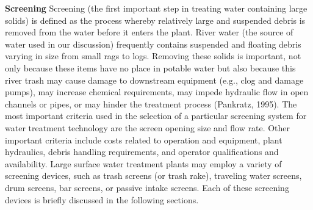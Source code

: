 \textbf{Screening}
Screening (the first important step in treating water containing large solids) is defined as the process whereby relatively large and suspended debris is removed from the water before it enters the plant. River water (the source of water used in our discussion) frequently contains suspended and floating debris varying in size from small rags to logs. Removing these solids is important, not only because these items have no place in potable water but also because this river trash may cause damage to downstream equipment (e.g., clog and damage pumps), may increase chemical requirements, may impede hydraulic flow in open channels or pipes, or may hinder the treatment process (Pankratz, 1995). The most important criteria used in the selection of a particular screening system for water treatment technology are the screen opening size and flow rate. Other important criteria include costs related to operation and equipment, plant hydraulics, debris handling requirements, and operator qualifications and availability. Large surface water treatment plants may employ a variety of screening devices, such as trash screens (or trash rake), traveling water screens, drum screens, bar screens, or passive intake screens. Each of these screening devices is briefly discussed in the following sections.\\
 


